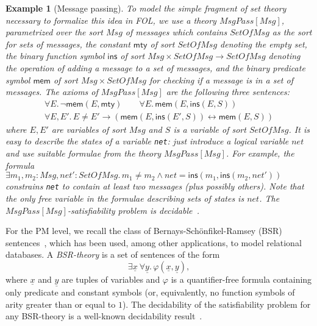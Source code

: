 \documentclass[conference]{IEEEtran}
\newtheorem{example}{Example}
\newcommand{\close}{\IEEEQEDclosed}
\begin{document}
\begin{example}[Message passing]
  To model the simple fragment of set theory necessary to formalize
  this idea in FOL, we use a theory $\mathit{MsgPass}[\mathit{Msg}]$,
  parametrized over the sort $\mathit{Msg}$ of messages which contains
  $\mathit{SetOfMsg}$ as the sort for sets of messages, the constant
  $\mathsf{mty}$ of sort $\mathit{SetOfMsg}$ denoting the empty set,
  the binary function symbol $\mathsf{ins}$ of sort $\mathit{Msg}
  \times \mathit{SetOfMsg} \rightarrow \mathit{SetOfMsg}$ denoting the
  operation of adding a message to a set of messages, and the binary
  predicate symbol $\mathsf{mem}$ of sort $\mathit{Msg} \times
  \mathit{SetOfMsg}$ for checking if a message is in a set of
  messages. The axioms of $\mathit{MsgPass}[\mathit{Msg}]$ are the
  following three sentences:
  \begin{eqnarray*}
    \forall E.\, \neg \mathsf{mem}(E, \mathsf{mty}) \quad\quad
    \forall E.\, \mathsf{mem}(E, \mathsf{ins}(E,S)) \\
    \forall E,E'.\, E\neq E' \rightarrow 
    (\mathsf{mem}(E, \mathsf{ins}(E',S)) \leftrightarrow \mathsf{mem}(E,S))
  \end{eqnarray*}
  where $E,E'$ are variables of sort $\mathit{Msg}$ and $S$ is a
  variable of sort $\mathit{SetOfMsg}$.  It is easy to describe the
  states of a variable \texttt{net}: just introduce a logical variable
  $\mathit{net}$ and use suitable formulae from the theory
  $\mathit{MsgPass}[\mathit{Msg}]$.  For example,
  the formula $\exists m_1,m_2 : \mathit{Msg}, \mathit{net}' :
  \mathit{SetOfMsg}.\, m_1\neq m_2 \wedge \mathit{net} =
  \mathsf{ins}(m_1,\mathsf{ins}(m_2,\mathit{net}'))$ constrains
  \texttt{net} to contain at least two messages (plus possibly
  others).  Note that the only free variable in the formulae
  describing sets of states is $\mathit{net}$.  The
  $\mathit{MsgPass}[\mathit{Msg}]$-satisfiability problem is
  decidable~\cite{ic03}.  \hfill \close
\end{example}

For the PM level, we recall the class of Bernays-Sch\"onfikel-Ramsey
(BSR) sentences~\cite{Boerger97}, which has been used, among other applications, to
model relational databases.  A \emph{BSR-theory} is a
set of sentences of the form
\begin{displaymath}
  \exists \underline{x}~\forall \underline{y}.\, 
    \varphi(\underline{x},\underline{y}) ,
\end{displaymath}
where $\underline{x}$ and $\underline{y}$ are tuples of variables and
$\varphi$ is a quantifier-free formula containing only predicate and
constant symbols (or, equivalently, no function symbols of arity
greater than or equal to $1$).  The decidability of the satisfiability
problem for any BSR-theory is a well-known decidability
result~\cite{Boerger97}.
\end{document}
